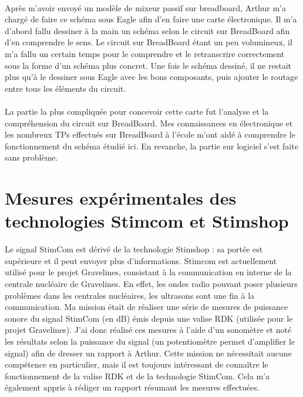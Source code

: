 \documentclass[12pt]{report}
\begin{document}
\paragraph{}
Après m'avoir envoyé un modèle de mixeur passif sur breadboard, Arthur m'a chargé de faire ce schéma sous Eagle afin d'en faire une carte électronique. Il m'a d'abord fallu dessiner à la main un schéma selon le circuit sur BreadBoard afin d'en comprendre le sens. Le circuit sur BreadBoard étant un peu volumineux, il m'a fallu un certain temps pour le comprendre et le retranscrire correctement sous la forme d'un schéma plus concret. Une fois le schéma dessiné, il ne restait plus qu'à le dessiner sous Eagle avec les bons composants, puis ajouter le routage entre tous les éléments du circuit. 

\paragraph{}
La partie la plus compliquée pour concevoir cette carte fut l'analyse et la compréhension du circuit sur BreadBoard. Mes connaissances en électronique et les nombreux TPs effectués sur BreadBoard à l'école m'ont aidé à comprendre le fonctionnement du schéma étudié ici. En revanche, la partie sur logiciel s'est faite sans problème. 

	\section{Mesures expérimentales des technologies Stimcom et Stimshop}

Le signal StimCom est dérivé de la technologie Stimshop : sa portée est supérieure et il peut envoyer plus d'informations. Stimcom est actuellement utilisé pour le projet Gravelines, consistant à la communication en interne de la centrale nucléaire de Gravelines. En effet, les ondes radio pouvant poser plusieurs problèmes dans les centrales nucléaires, les ultrasons sont une fin à la communication. 
Ma mission était de réaliser une série de mesures de puissance sonore du signal StimCom (en dB) émis depuis une valise RDK (utilisée pour le projet Gravelines). J'ai donc réalisé ces mesures à l'aide d'un sonomètre et noté les résultats selon la puissance du signal (un potentiomètre permet d'amplifier le signal) afin de dresser un rapport à Arthur. 
Cette mission ne nécessitait aucune compétence en particulier, mais il est toujours intéressant de connaître le fonctionnement de la valise RDK et de la technologie StimCom. Cela m'a également appris à rédiger un rapport résumant les mesures effectuées.\\
\end{document}
